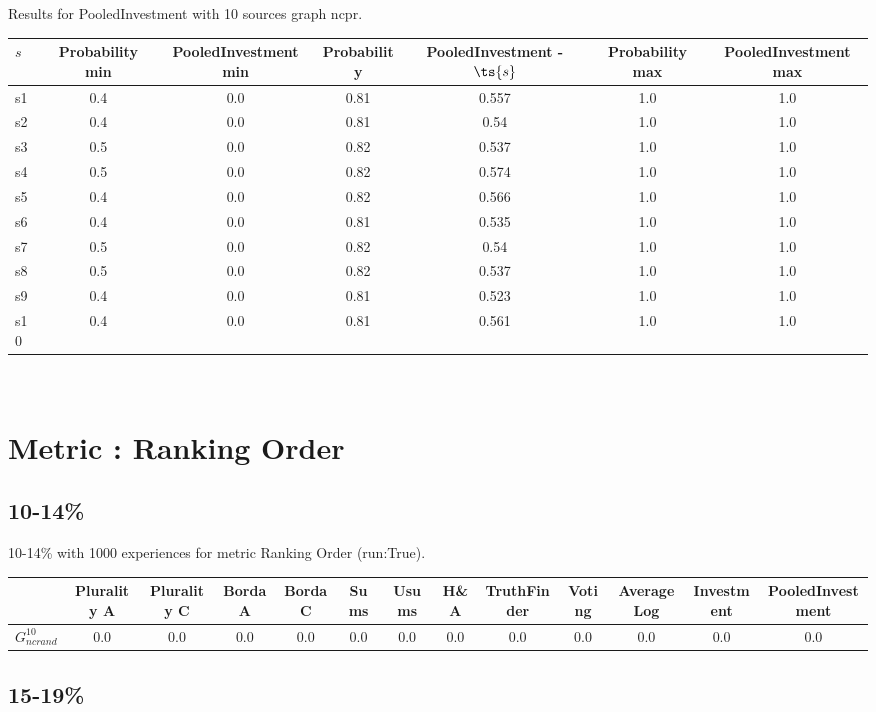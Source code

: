 \documentclass{article}
\newcommand{\graph}[2]{$G_{#1}^{#2}$}
\begin{document}
\noindent Results for PooledInvestment with 10 sources graph ncpr.

\noindent\begin{tabular}{|l|c|c|c|c|c|c|}
\hline
$s$& Probability min & PooledInvestment min & Probability & PooledInvestment - $\ts{s}$ & Probability max & PooledInvestment max\\
\hline
s1 &0.4 & 0.0 & 0.81 & 0.557 & 1.0 & 1.0\\
\hline
s2 &0.4 & 0.0 & 0.81 & 0.54 & 1.0 & 1.0\\
\hline
s3 &0.5 & 0.0 & 0.82 & 0.537 & 1.0 & 1.0\\
\hline
s4 &0.5 & 0.0 & 0.82 & 0.574 & 1.0 & 1.0\\
\hline
s5 &0.4 & 0.0 & 0.82 & 0.566 & 1.0 & 1.0\\
\hline
s6 &0.4 & 0.0 & 0.81 & 0.535 & 1.0 & 1.0\\
\hline
s7 &0.5 & 0.0 & 0.82 & 0.54 & 1.0 & 1.0\\
\hline
s8 &0.5 & 0.0 & 0.82 & 0.537 & 1.0 & 1.0\\
\hline
s9 &0.4 & 0.0 & 0.81 & 0.523 & 1.0 & 1.0\\
\hline
s10 &0.4 & 0.0 & 0.81 & 0.561 & 1.0 & 1.0\\
\hline
\end{tabular}\\

\newpage
\section{Metric : Ranking Order}

\newpage

\subsection{10-14\%}

10-14\% with 1000 experiences for metric Ranking Order (run:True).

\noindent\begin{tabular}{|l|c|c|c|c|c|c|c|c|c|c|c|c|}
\hline
& Plurality A& Plurality C& Borda A& Borda C& Sums& Usums& H\&A& TruthFinder& Voting& AverageLog& Investment& PooledInvestment\\
\hline
\graph{ncrand}{10} &0.0&0.0&0.0&0.0&0.0&0.0&0.0&0.0&0.0&0.0&0.0&0.0\\
\hline
\end{tabular}
\newpage

\subsection{15-19\%}
\end{document}
